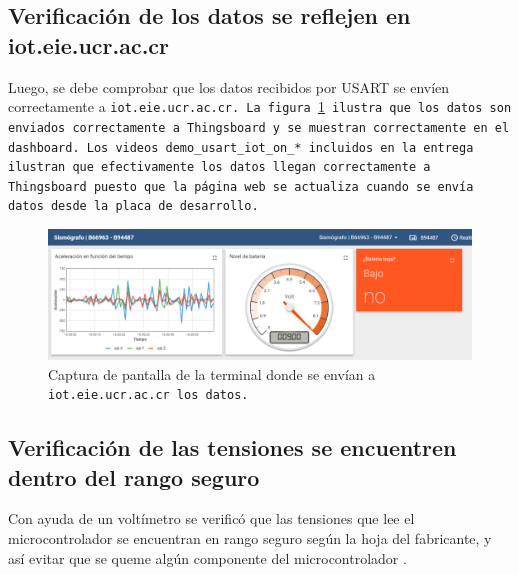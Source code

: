 \subsection{Verificación de los datos se reflejen en iot.eie.ucr.ac.cr}
Luego, se debe comprobar que los datos recibidos por USART se envíen correctamente a \tt{iot.eie.ucr.ac.cr}. La figura \ref{iot-data-received} ilustra que los datos son enviados correctamente a Thingsboard y se muestran correctamente en el dashboard. Los videos \tt{demo\_usart\_iot\_on\_*} incluidos en la entrega ilustran que efectivamente los datos llegan correctamente a Thingsboard puesto que la página web se actualiza cuando se envía datos desde la placa de desarrollo.
\begin{figure}[H]
    \centering
    \includegraphics[width=\textwidth]{Imagenes/iot_data_received.png}
    \caption{Captura de pantalla de la terminal donde se envían a \tt{iot.eie.ucr.ac.cr} los datos.}
    \label{iot-data-received}
\end{figure}


\subsection{Verificación de las tensiones se encuentren dentro del rango seguro}

Con ayuda de un voltímetro se verificó que las tensiones que lee el microcontrolador se encuentran en rango seguro según la hoja del fabricante, y así evitar que se queme algún componente del microcontrolador \cite{stm32micro, datasheet}.


